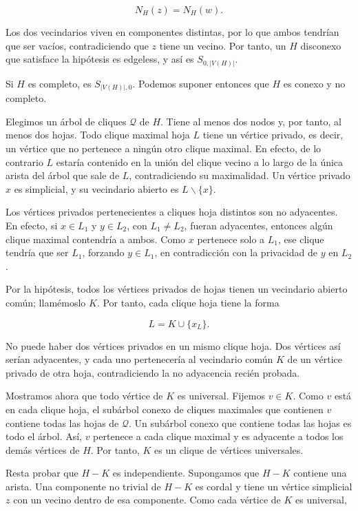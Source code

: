 \documentclass[
  11pt,
]{article}
\begin{document}
\[
N_H(z)=N_H(w).
\]

Los dos vecindarios viven en componentes distintas, por lo que ambos
tendrían que ser vacíos, contradiciendo que \(z\) tiene un vecino. Por
tanto, un \(H\) disconexo que satisface la hipótesis es edgeless, y así
es \(S_{0,|V(H)|}\).

Si \(H\) es completo, es \(S_{|V(H)|,0}\). Podemos suponer entonces que
\(H\) es conexo y no completo.

Elegimos un árbol de cliques \(\mathcal Q\) de \(H\). Tiene al menos dos
nodos y, por tanto, al menos dos hojas. Todo clique maximal hoja \(L\)
tiene un vértice privado, es decir, un vértice que no pertenece a ningún
otro clique maximal. En efecto, de lo contrario \(L\) estaría contenido
en la unión del clique vecino a lo largo de la única arista del árbol
que sale de \(L\), contradiciendo su maximalidad. Un vértice privado
\(x\) es simplicial, y su vecindario abierto es \(L\backslash\{x\}\).

Los vértices privados pertenecientes a cliques hoja distintos son no
adyacentes. En efecto, si \(x\in L_1\) y \(y\in L_2\), con
\(L_1\ne L_2\), fueran adyacentes, entonces algún clique maximal
contendría a ambos. Como \(x\) pertenece solo a \(L_1\), ese clique
tendría que ser \(L_1\), forzando \(y\in L_1\), en contradicción con la
privacidad de \(y\) en \(L_2\).

Por la hipótesis, todos los vértices privados de hojas tienen un
vecindario abierto común; llamémoslo \(K\). Por tanto, cada clique hoja
tiene la forma

\[
L=K\cup\{x_L\}.
\]

No puede haber dos vértices privados en un mismo clique hoja. Dos
vértices así serían adyacentes, y cada uno pertenecería al vecindario
común \(K\) de un vértice privado de otra hoja, contradiciendo la no
adyacencia recién probada.

Mostramos ahora que todo vértice de \(K\) es universal. Fijemos
\(v\in K\). Como \(v\) está en cada clique hoja, el subárbol conexo de
cliques maximales que contienen \(v\) contiene todas las hojas de
\(\mathcal Q\). Un subárbol conexo que contiene todas las hojas es todo
el árbol. Así, \(v\) pertenece a cada clique maximal y es adyacente a
todos los demás vértices de \(H\). Por tanto, \(K\) es un clique de
vértices universales.

Resta probar que \(H-K\) es independiente. Supongamos que \(H-K\)
contiene una arista. Una componente no trivial de \(H-K\) es cordal y
tiene un vértice simplicial \(z\) con un vecino dentro de esa
componente. Como cada vértice de \(K\) es universal,
\end{document}

